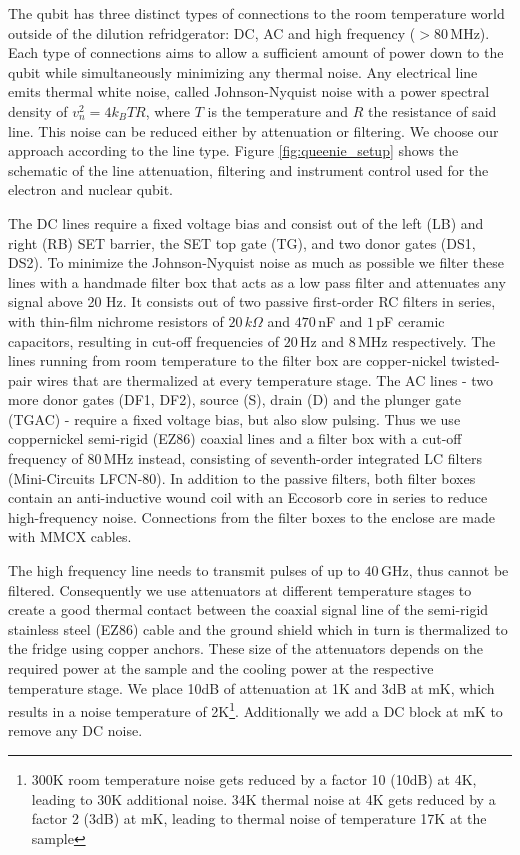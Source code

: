 The qubit has three distinct types of connections to the room temperature world outside of the dilution refridgerator: DC, AC and high frequency ($>80\,$MHz). Each type of connections aims to allow a sufficient amount of power down to the qubit while simultaneously minimizing any thermal noise. Any electrical line emits thermal white noise, called Johnson-Nyquist noise \cite{Johnson, Nyquist} with a power spectral density of $v_n^2=4k_BTR$, where $T$ is the temperature and $R$ the resistance of said line. This noise can be reduced either by attenuation or filtering. We choose our approach according to the line type. 
Figure \ref{fig:queenie_setup} shows the schematic of the line attenuation,  filtering and instrument control used for the electron and nuclear qubit. 

The DC lines require a fixed voltage bias and consist out of the left (LB) and right (RB) SET barrier, the SET top gate (TG), and two donor gates (DS1, DS2). To minimize the Johnson-Nyquist noise as much as possible we filter these lines with a handmade filter box that acts as a low pass filter and attenuates any signal above 20 Hz. It consists out of two passive first-order RC filters in series, with thin-film nichrome resistors of $20\,k\Omega$ and $470\,$nF and $1\,$pF ceramic capacitors, resulting in cut-off frequencies of $20\,$Hz and $8\,$MHz respectively. The lines running from room temperature to the filter box are copper-nickel twisted-pair wires that are thermalized at every temperature stage. 
The AC lines - two more donor gates (DF1, DF2), source (S), drain (D) and the plunger gate (TGAC) - require a fixed voltage bias, but also slow pulsing. Thus we use coppernickel semi-rigid (EZ86) coaxial lines and a filter box with a cut-off frequency of $80\,$MHz instead, consisting of seventh-order integrated LC filters (Mini-Circuits LFCN-80). 
In addition to the passive filters, both filter boxes contain an anti-inductive wound coil with an Eccosorb core in series to reduce high-frequency noise.  Connections from the filter boxes to the enclose are made with MMCX cables. 

The high frequency line needs to transmit pulses of up to $40\,$GHz, thus cannot be filtered. Consequently we use attenuators at different temperature stages to create a good thermal contact between the coaxial signal line of the semi-rigid stainless steel (EZ86) cable and the ground shield which in turn is thermalized to the fridge using copper anchors. These size of the attenuators depends on the required power at the sample and the cooling power at the respective temperature stage. 
We place 10dB of attenuation at 1K and 3dB at mK, which results in a noise temperature of 2K\footnote{300K room temperature noise gets reduced by a factor 10 (10dB) at 4K, leading to 30K additional noise. 34K thermal noise at 4K gets reduced by a factor 2 (3dB) at mK, leading to thermal noise of temperature 17K at the sample}. 
Additionally we add a DC block at mK to remove any DC noise. 

